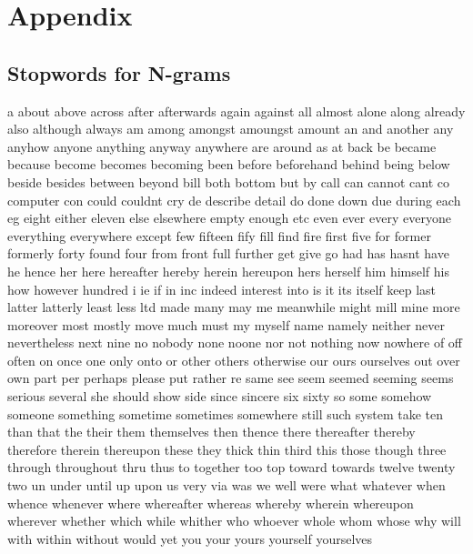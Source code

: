 
\renewcommand{\theequation}{B\arabic{equation}}
\setcounter{equation}{0}
\renewcommand{\thefigure}{B\arabic{figure}}
\setcounter{figure}{0}
\renewcommand{\thetable}{B\arabic{table}}
\setcounter{table}{0}


\clearpage

\thesisappendix

\section{Appendix}

\subsection*{Stopwords for N-grams}
\label{sub:Stopwords for N-grams}

a
about
above
across
after
afterwards
again
against
all
almost
alone
along
already
also
although
always
am
among
amongst
amoungst
amount
an
and
another
any
anyhow
anyone
anything
anyway
anywhere
are
around
as
at
back
be
became
because
become
becomes
becoming
been
before
beforehand
behind
being
below
beside
besides
between
beyond
bill
both
bottom
but
by
call
can
cannot
cant
co
computer
con
could
couldnt
cry
de
describe
detail
do
done
down
due
during
each
eg
eight
either
eleven
else
elsewhere
empty
enough
etc
even
ever
every
everyone
everything
everywhere
except
few
fifteen
fify
fill
find
fire
first
five
for
former
formerly
forty
found
four
from
front
full
further
get
give
go
had
has
hasnt
have
he
hence
her
here
hereafter
hereby
herein
hereupon
hers
herself
him
himself
his
how
however
hundred
i
ie
if
in
inc
indeed
interest
into
is
it
its
itself
keep
last
latter
latterly
least
less
ltd
made
many
may
me
meanwhile
might
mill
mine
more
moreover
most
mostly
move
much
must
my
myself
name
namely
neither
never
nevertheless
next
nine
no
nobody
none
noone
nor
not
nothing
now
nowhere
of
off
often
on
once
one
only
onto
or
other
others
otherwise
our
ours
ourselves
out
over
own
part
per
perhaps
please
put
rather
re
same
see
seem
seemed
seeming
seems
serious
several
she
should
show
side
since
sincere
six
sixty
so
some
somehow
someone
something
sometime
sometimes
somewhere
still
such
system
take
ten
than
that
the
their
them
themselves
then
thence
there
thereafter
thereby
therefore
therein
thereupon
these
they
thick
thin
third
this
those
though
three
through
throughout
thru
thus
to
together
too
top
toward
towards
twelve
twenty
two
un
under
until
up
upon
us
very
via
was
we
well
were
what
whatever
when
whence
whenever
where
whereafter
whereas
whereby
wherein
whereupon
wherever
whether
which
while
whither
who
whoever
whole
whom
whose
why
will
with
within
without
would
yet
you
your
yours
yourself
yourselves


